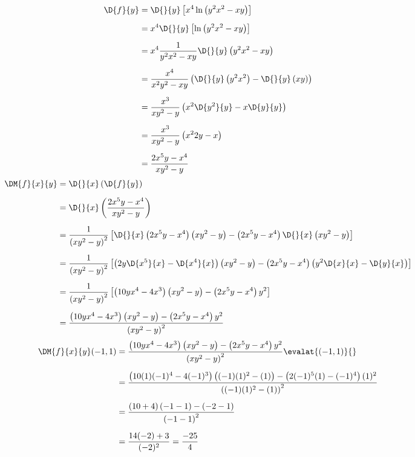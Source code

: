 \documentclass[a4paper,12pt,fleqn]{article}
\begin{document}
\begin{answer}
  \begin{align*}
    \D{f}{y}
    & = \D{}{y} \left[x^4 \ln\left(y^2x^2 - xy\right)\right] \\[2mm]
    & = x^4 \D{}{y} \left[\ln\left(y^2x^2 - xy\right)\right] \\[2mm]
    & = x^4 \frac{1}{y^2x^2 - xy} \D{}{y}\left(y^2x^2 - xy\right) \\[2mm]
    & = \frac{x^4}{x^2y^2 - xy} \left(
          \D{}{y}\left(y^2x^2\right) - \D{}{y}\left(xy\right)
        \right) \\[2mm]
    & = \frac{x^3}{xy^2 - y} \left(x^2\D{y^2}{y} - x\D{y}{y}\right) \\[2mm]
    & = \frac{x^3}{xy^2 - y} \left(x^22y - x\right) \\[2mm]
    & = \frac{2x^5y - x^4}{xy^2 - y}
  \end{align*}
  \begin{align*}
    \DM{f}{x}{y}
    & = \D{}{x}\left(\D{f}{y}\right) \\[2mm]
    & = \D{}{x}\left(\frac{2x^5y - x^4}{xy^2 - y}\right) \\[2mm]
    & = \frac{1}{\left(xy^2 - y\right)^2}\left[
          \D{}{x}\left(2x^5y - x^4\right)\left(xy^2 - y\right) -
          \left(2x^5y - x^4\right)\D{}{x}\left(xy^2 - y\right)
        \right]\\[2mm]
    & = \frac{1}{\left(xy^2 - y\right)^2}\left[
          \left(2y\D{x^5}{x} - \D{x^4}{x}\right)\left(xy^2 - y\right) -
          \left(2x^5y - x^4\right)\left(y^2\D{x}{x} - \D{y}{x}\right)
        \right]\\[2mm]
    & = \frac{1}{\left(xy^2 - y\right)^2}\left[
          \left(10yx^4 - 4x^3\right)\left(xy^2 - y\right) -
          \left(2x^5y - x^4\right)y^2
        \right]\\[2mm]
    & = \frac{\left(10yx^4 - 4x^3\right)\left(xy^2 - y\right) -
              \left(2x^5y - x^4\right)y^2}
             {\left(xy^2 - y\right)^2}
  \end{align*}
  \begin{align*}
    \DM{f}{x}{y}(-1, 1)
    & = \frac{\left(10yx^4 - 4x^3\right)\left(xy^2 - y\right) -
              \left(2x^5y - x^4\right)y^2}
             {\left(xy^2 - y\right)^2}\evalat{(-1, 1)}{} \\[2mm]
    & = \frac{\left(10(1)(-1)^4 - 4(-1)^3\right)\left((-1)(1)^2 - (1)\right) -
              \left(2(-1)^5(1) - (-1)^4\right)(1)^2}
             {\left((-1)(1)^2 - (1)\right)^2} \\[2mm]
    & = \frac{\left(10 + 4\right)\left(-1 - 1\right) -
              \left(-2 - 1\right)}
             {\left(-1 - 1\right)^2} \\[2mm]
    & = \frac{14(-2) + 3}{(-2)^2}
    = \frac{-25}{4}
  \end{align*}
\end{answer}
\end{document}
